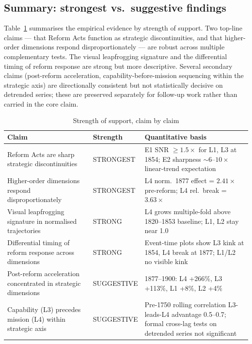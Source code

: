 \documentclass[11pt]{article}
\begin{document}
\subsection{Summary: strongest vs.\ suggestive findings}

Table~\ref{tab:strength} summarises the empirical evidence by strength of support. Two top-line claims --- that Reform Acts function as strategic discontinuities, and that higher-order dimensions respond disproportionately --- are robust across multiple complementary tests. The visual leapfrogging signature and the differential timing of reform response are strong but more descriptive. Several secondary claims (post-reform acceleration, capability-before-mission sequencing within the strategic axis) are directionally consistent but not statistically decisive on detrended series; these are preserved separately for follow-up work rather than carried in the core claim.

\begin{table}[t]
\centering
\caption{Strength of support, claim by claim}
\label{tab:strength}
\small
\begin{tabular}{p{6cm}lp{6cm}}
\toprule
Claim & Strength & Quantitative basis \\
\midrule
Reform Acts are sharp strategic discontinuities & STRONGEST & E1 SNR $\geq 1.5\times$ for L1, L3 at 1854; E2 sharpness $\sim 6$--$10\times$ linear-trend expectation \\
Higher-order dimensions respond disproportionately & STRONGEST & L4 norm.~1877 effect = $2.41\times$ pre-reform; L4 rel.~break = $3.63\times$ \\
Visual leapfrogging signature in normalised trajectories & STRONG & L4 grows multiple-fold above 1820--1853 baseline; L1, L2 stay near 1.0 \\
Differential timing of reform response across dimensions & STRONG & Event-time plots show L3 kink at 1854, L4 break at 1877; L1/L2 no visible kink \\
Post-reform acceleration concentrated in strategic dimensions & SUGGESTIVE & 1877--1900: L4 +266\%, L3 +113\%, L1 +8\%, L2 +4\% \\
Capability (L3) precedes mission (L4) within strategic axis & SUGGESTIVE & Pre-1750 rolling correlation L3-leads-L4 advantage 0.5--0.7; formal cross-lag tests on detrended series not significant \\
\bottomrule
\end{tabular}
\end{table}
\end{document}
